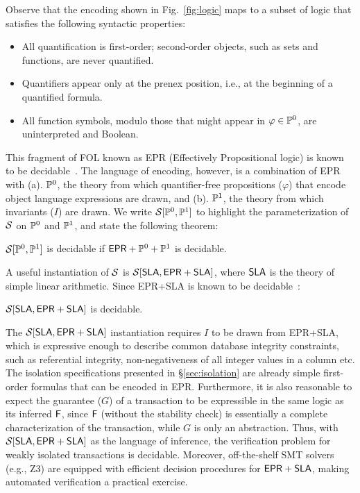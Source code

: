 Observe that the encoding shown in Fig.~\ref{fig:logic} maps to
a subset of logic that satisfies the following syntactic properties:
\begin{itemize}
  \item All quantification is first-order; second-order objects, such
    as sets and functions, are never quantified.
  \item Quantifiers appear only at the prenex position, i.e., at the
    beginning of a quantified formula.  
  \item All function symbols, modulo those that might appear in
    $\varphi\in\mathbb{P}^0$, are uninterpreted and Boolean.
\end{itemize}
This fragment of FOL known as EPR (Effectively Propositional logic)
is known to be decidable~\cite{z3epr}. The language of encoding, however, is a
combination of {\sf EPR} with (a). $\mathbb{P}^0$, the theory from which
quantifier-free propositions ($\varphi$) that encode object language
expressions are drawn, and (b).  $\mathbb{P}^1$, the theory from which
invariants ($I$) are drawn. We write $\mathcal{S}[\mathbb{P}^0,\mathbb{P}^1]$ to
highlight the parameterization of $\mathcal{S}$ on $\mathbb{P}^0$ and $\mathbb{P}^1$,
and state the following theorem:
\begin{theorem}
  $\mathcal{S}[\mathbb{P}^0,\mathbb{P}^1]$ is decidable if ${\sf EPR}+\mathbb{P}^0+\mathbb{P}^1$
  is decidable.
\end{theorem}
A useful instantiation of $\mathcal{S}$ is $\mathcal{S}[{\sf SLA},{\sf EPR}+{\sf
SLA}]$, where ${\sf SLA}$ is the theory of simple linear arithmetic.
Since {\sf EPR}+{\sf SLA} is known to be decidable~\cite{eprsla}:
\begin{theorem}
  $\mathcal{S}[{\sf SLA},{\sf EPR}+{\sf SLA}]$ is decidable.
\end{theorem}
The $\mathcal{S}[{\sf SLA},{\sf EPR}+{\sf SLA}]$ instantiation requires $I$ to
be drawn from {\sf EPR}+{\sf SLA}, which is expressive enough to
describe common database integrity constraints, such as referential
integrity, non-negativeness of all integer values in a column etc.
The isolation specifications presented in \S\ref{sec:isolation} are
already simple first-order formulas that can be encoded in {\sf EPR}.
Furthermore, it is also reasonable to expect the guarantee ($G$) of a
transaction to be expressible in the same logic as its inferred ${\sf F}$,
since ${\sf F}$ (without the stability check) is essentially a complete
characterization of the transaction, while $G$ is only an abstraction.
Thus, with $\mathcal{S}[{\sf SLA},{\sf EPR}+{\sf SLA}]$ as the language of
inference, the verification problem for weakly isolated transactions
is decidable. Moreover, off-the-shelf SMT solvers (e.g., Z3) are
equipped with efficient decision procedures for ${\sf EPR}+{\sf SLA}$,
making automated verification a practical exercise.

